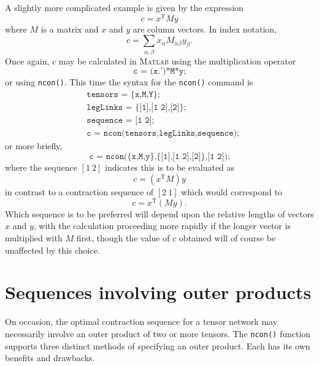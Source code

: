 \documentclass[aps,prb,reprint,superscriptaddress,amsmath,amsfonts]{revtex4-1}
\theoremstyle{definition}
\newcommand{\mrm}[1]{\mathrm{#1}}
\newcommand{\MATLAB}{\textsc{Matlab}}
\newcommand{\ttt}[1]{\texttt{#1}}
\begin{document}
A slightly more complicated example is given by the expression
\begin{equation}
c = x^\mrm{T}My
\end{equation}
where $M$ is a matrix and $x$ and $y$ are column vectors. In index notation,
\begin{equation}
c = \sum_{\alpha,\beta} x_\alpha M_{\alpha\beta} y_\beta.
\end{equation}
Once again, $c$ may be calculated in \MATLAB{} using the multiplication operator
\begin{equation*}
\ttt{c = (x.')*M*y;}
\end{equation*}
or using \ttt{ncon()}. This time the syntax for the \ttt{ncon()} command is
\begin{align*}
&\ttt{tensors = \{x,M,Y\};}\\
&\ttt{legLinks = \{[1],[1 2],[2]\};}\\
&\ttt{sequence = [1 2];}\\
&\ttt{c = ncon(tensors,legLinks,sequence);}
\end{align*}
or more briefly,
\begin{equation*}
\ttt{c = ncon(\{x,M,y\},\{[1],[1 2],[2]\},[1 2]);}
\end{equation*}
where the sequence $[1~2]$ indicates this is to be evaluated as
\begin{equation}
c = (x^\mrm{T}M)y
\end{equation}
in contrast to a contraction sequence of $[2~1]$ which would correspond to
\begin{equation}
c = x^\mrm{T}(My).
\end{equation}
Which sequence is to be preferred will depend upon the relative lengths of vectors $x$ and $y$, with the calculation proceeding more rapidly if the longer vector is multiplied with $M$ first, though the value of $c$ obtained will of course be unaffected by this choice.















\section{Sequences involving outer products\label{sec:outerprod}}

On occasion, the optimal contraction sequence for a tensor network may necessarily involve an outer product of two or more tensors. The \ttt{ncon()} function supports three distinct methods of specifying an outer product. Each has its own benefits and drawbacks.
\end{document}

